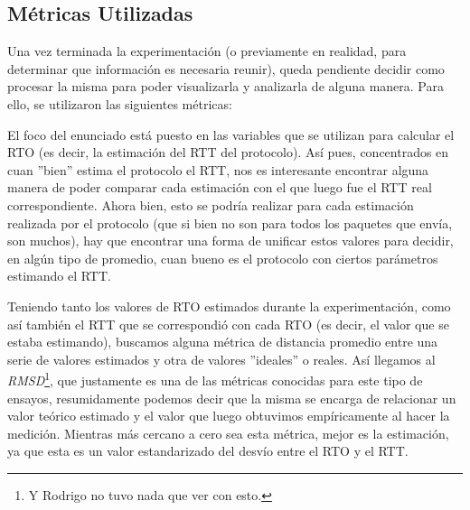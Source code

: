 
\subsection{M\'etricas Utilizadas}\label{sec:variables_metricas:metricas}
\par Una vez terminada la experimentaci\'on (o previamente en realidad, para
determinar que informaci\'on es necesaria reunir), queda pendiente decidir como
procesar la misma para poder visualizarla y analizarla de alguna manera. Para
ello, se utilizaron las siguientes m\'etricas: 

\begin{description}
    \bigskip
    \item[\textbf{Root Mean Square Deviation:}] El foco del enunciado est\'a
        puesto en las variables que se utilizan para calcular el RTO (es decir,
        la estimaci\'on del RTT del protocolo). As\'i pues, concentrados en cuan
        ''bien'' estima el protocolo el RTT, nos es interesante encontrar alguna
        manera de poder comparar cada estimaci\'on con el que luego fue el RTT
        real correspondiente. Ahora bien, esto se podr\'ia realizar para cada
        estimaci\'on realizada por el protocolo (que si bien no son para todos
        los paquetes que env\'ia, son muchos), hay que encontrar una forma de
        unificar estos valores para decidir, en alg\'un tipo de promedio, cuan
        bueno es el protocolo con ciertos par\'ametros estimando el RTT.

        \par Teniendo tanto los valores de RTO estimados durante la
        experimentaci\'on, como as\'i tambi\'en el RTT que se correspondi\'o con
        cada RTO (es decir, el valor que se estaba estimando), buscamos alguna
        m\'etrica de distancia promedio entre una serie de valores estimados y
        otra de valores ''ideales'' o reales. As\'i llegamos al
        \emph{RMSD}\footnote{Y Rodrigo no tuvo nada que ver con
        esto.}\cite{rmsd}, que justamente es una de las m\'etricas conocidas
        para este tipo de ensayos, resumidamente podemos decir que la misma se 
        encarga de relacionar un valor te\'orico estimado y el valor que luego
        obtuvimos emp\'iricamente al hacer la medici\'on. Mientras m\'as cercano
        a cero sea esta m\'etrica, mejor es la estimaci\'on, ya que esta es un
        valor estandarizado del desv\'io entre el RTO y el RTT.


\end{description}
